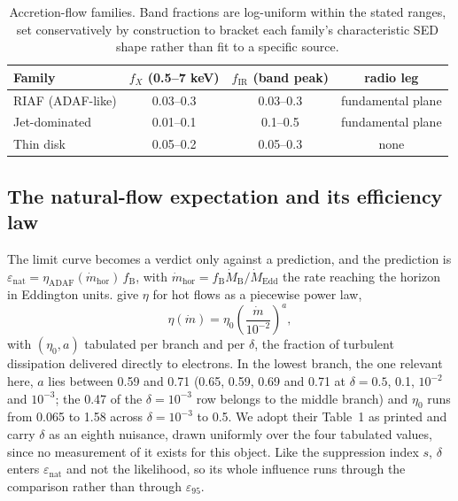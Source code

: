 \documentclass[11pt]{article}
\newcommand{\mdotB}{\ensuremath{\dot{M}_{\mathrm{B}}}}
\newcommand{\epsl}{\ensuremath{\varepsilon_{95}}}
\begin{document}
\begin{table}[tbp]
\centering
\small
\caption{Accretion-flow families. Band fractions are log-uniform within the stated ranges, set conservatively by construction to bracket each family's characteristic SED shape rather than fit to a specific source.}
\label{tab:families}
\begin{tabular}{lccc}
\toprule
Family & $f_{X}$ (0.5--7 keV) & $f_{\mathrm{IR}}$ (band peak) & radio leg \\
\midrule
RIAF (ADAF-like) & 0.03--0.3 & 0.03--0.3 & fundamental plane \\
Jet-dominated & 0.01--0.1 & 0.1--0.5 & fundamental plane \\
Thin disk & 0.05--0.2 & 0.05--0.3 & none \\
\bottomrule
\end{tabular}
\end{table}

\subsection{The natural-flow expectation and its efficiency law}
\label{sec:eta}

The limit curve becomes a verdict only against a prediction, and the prediction is $\varepsilon_{\mathrm{nat}} = \eta_{\mathrm{ADAF}}(\dot{m}_{\mathrm{hor}})\,f_{\mathrm{B}}$, with $\dot{m}_{\mathrm{hor}} = f_{\mathrm{B}}\mdotB/\dot{M}_{\mathrm{Edd}}$ the rate reaching the horizon in Eddington units. \citet{XieYuan2012} give $\eta$ for hot flows as a piecewise power law,
\begin{equation}
\eta(\dot{m}) = \eta_{0}\left(\frac{\dot{m}}{10^{-2}}\right)^{a},
\label{eq:xy12}
\end{equation}
with $(\eta_{0}, a)$ tabulated per branch and per $\delta$, the fraction of turbulent dissipation delivered directly to electrons. In the lowest branch, the one relevant here, $a$ lies between 0.59 and 0.71 (0.65, 0.59, 0.69 and 0.71 at $\delta = 0.5$, 0.1, $10^{-2}$ and $10^{-3}$; the 0.47 of the $\delta = 10^{-3}$ row belongs to the middle branch) and $\eta_{0}$ runs from 0.065 to 1.58 across $\delta = 10^{-3}$ to 0.5. We adopt their Table~1 as printed and carry $\delta$ as an eighth nuisance, drawn uniformly over the four tabulated values, since no measurement of it exists for this object. Like the suppression index $s$, $\delta$ enters $\varepsilon_{\mathrm{nat}}$ and not the likelihood, so its whole influence runs through the comparison rather than through \epsl.
\end{document}
